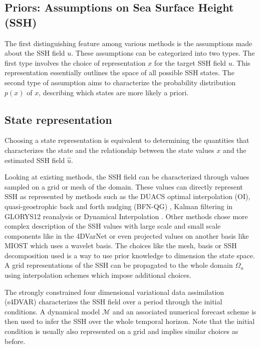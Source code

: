 \begin{bibunit}
 
 \section{Priors: Assumptions on Sea Surface Height (SSH)}
The first distinguishing feature among various methods is the assumptions made about the SSH field $u$. These assumptions can be categorized into two types.
The first type involves the choice of representation $x$ for the target SSH field $u$. This representation essentially outlines the space of all possible SSH states.
The second type of assumption aims to characterize the probability distribution $p(x)$ of $x$, describing which states are more likely a priori.



 
  \subsection{State representation}
Choosing a state representation is equivalent to determining the quantities that characterizes the state and the relationship between the state values $x$ and the estimated SSH field $\hat{u}$.


  Looking at existing methods, the SSH field can be characterized through values sampled on a grid or mesh of the domain. These values can directly represent SSH as represented by methods such as the DUACS optimal interpolation \cite{taburetDUACSDT2018252019} (OI), quasi-geostrophic back and forth nudging (BFN-QG) \cite{guillouMappingAltimetryForthcoming2021}, Kalman filtering in GLORYS12 reanalysis \cite{lelloucheCopernicusGlobal122021} or Dynamical Interpolation \cite{ubelmannDynamicInterpolationSea2015,ballarottaDynamicMappingAlongTrack2020} .
  Other methods chose more complex description of the SSH values with large scale and small scale components like in the 4DVarNet\cite{beauchamp4DVarNetSSHEndtoendLearning2023} or even projected values on another basis like MIOST\cite{ubelmannReconstructingOceanSurface2021,ubelmannSimultaneousEstimationOcean2022} which uses a wavelet basis.
  The choices like the mesh, basis or SSH decomposition used is a way to use prior knowledge to dimension the state space. A grid representations of the SSH can be propagated to the whole domain $\Omega_u$ using interpolation schemes which impose additional choices.

  The strongly constrained four dimensional variational data assimilation (s4DVAR)\cite{carrassiDataAssimilationGeosciences2018} characterizes the SSH field over a period through the initial conditions. A dynamical model $\mathcal{M}$ and an associated numerical forecast scheme  is then used to infer the SSH over the whole temporal horizon. Note that the initial condition is usually also represented on a grid and implies similar choices as before. 


\end{bibunit}

